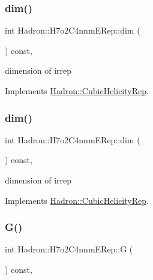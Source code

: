 \subsubsection{\texorpdfstring{dim()}{dim()}\hspace{0.1cm}{\footnotesize\ttfamily [1/2]}}
{\footnotesize\ttfamily int Hadron\+::\+H7o2\+C4nnm\+E\+Rep\+::dim (\begin{DoxyParamCaption}{ }\end{DoxyParamCaption}) const\hspace{0.3cm}{\ttfamily [inline]}, {\ttfamily [virtual]}}

dimension of irrep 

Implements \mbox{\hyperlink{structHadron_1_1CubicHelicityRep_a95d229a05580e65f8bdde74a1e316855}{Hadron\+::\+Cubic\+Helicity\+Rep}}.

\mbox{\label{structHadron_1_1H7o2C4nnmERep_ac2a28af759178ce1d0cf8ec5bd772198}} 
\subsubsection{\texorpdfstring{dim()}{dim()}\hspace{0.1cm}{\footnotesize\ttfamily [2/2]}}
{\footnotesize\ttfamily int Hadron\+::\+H7o2\+C4nnm\+E\+Rep\+::dim (\begin{DoxyParamCaption}{ }\end{DoxyParamCaption}) const\hspace{0.3cm}{\ttfamily [inline]}, {\ttfamily [virtual]}}

dimension of irrep 

Implements \mbox{\hyperlink{structHadron_1_1CubicHelicityRep_a95d229a05580e65f8bdde74a1e316855}{Hadron\+::\+Cubic\+Helicity\+Rep}}.

\mbox{\label{structHadron_1_1H7o2C4nnmERep_a55e0c3bf732ef6bd2ae6b0948fa7e21c}} 
\subsubsection{\texorpdfstring{G()}{G()}\hspace{0.1cm}{\footnotesize\ttfamily [1/2]}}
{\footnotesize\ttfamily int Hadron\+::\+H7o2\+C4nnm\+E\+Rep\+::G (\begin{DoxyParamCaption}{ }\end{DoxyParamCaption}) const\hspace{0.3cm}{\ttfamily [inline]}, {\ttfamily [virtual]}}

